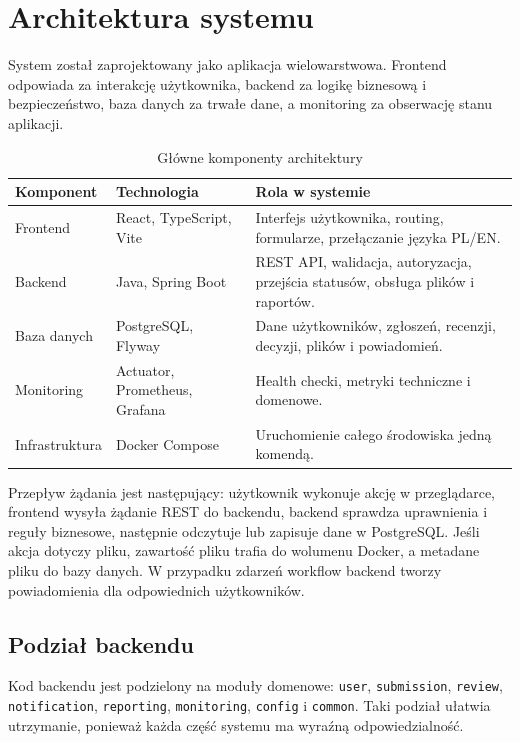 \documentclass[times]{san}
\begin{document}
\section{Architektura systemu}

System został zaprojektowany jako aplikacja wielowarstwowa. Frontend odpowiada za interakcję użytkownika, backend za logikę biznesową i bezpieczeństwo, baza danych za trwałe dane, a monitoring za obserwację stanu aplikacji.

\begin{table}[!htbp]
\centering
\caption{Główne komponenty architektury}
\label{tab:components}
\begin{tabular}{|p{}|p{}|p{}|}
\hline
Komponent & Technologia & Rola w systemie \\
\hline
Frontend & React, TypeScript, Vite & Interfejs użytkownika, routing, formularze, przełączanie języka PL/EN. \\
\hline
Backend & Java, Spring Boot & REST API, walidacja, autoryzacja, przejścia statusów, obsługa plików i raportów. \\
\hline
Baza danych & PostgreSQL, Flyway & Dane użytkowników, zgłoszeń, recenzji, decyzji, plików i powiadomień. \\
\hline
Monitoring & Actuator, Prometheus, Grafana & Health checki, metryki techniczne i domenowe. \\
\hline
Infrastruktura & Docker Compose & Uruchomienie całego środowiska jedną komendą. \\
\hline
\end{tabular}
\end{table}

Przepływ żądania jest następujący: użytkownik wykonuje akcję w przeglądarce, frontend wysyła żądanie REST do backendu, backend sprawdza uprawnienia i reguły biznesowe, następnie odczytuje lub zapisuje dane w PostgreSQL. Jeśli akcja dotyczy pliku, zawartość pliku trafia do wolumenu Docker, a metadane pliku do bazy danych. W przypadku zdarzeń workflow backend tworzy powiadomienia dla odpowiednich użytkowników.

\subsection{Podział backendu}

Kod backendu jest podzielony na moduły domenowe: \texttt{user}, \texttt{submission}, \texttt{review}, \texttt{notification}, \texttt{reporting}, \texttt{monitoring}, \texttt{config} i \texttt{common}. Taki podział ułatwia utrzymanie, ponieważ każda część systemu ma wyraźną odpowiedzialność.
\end{document}
